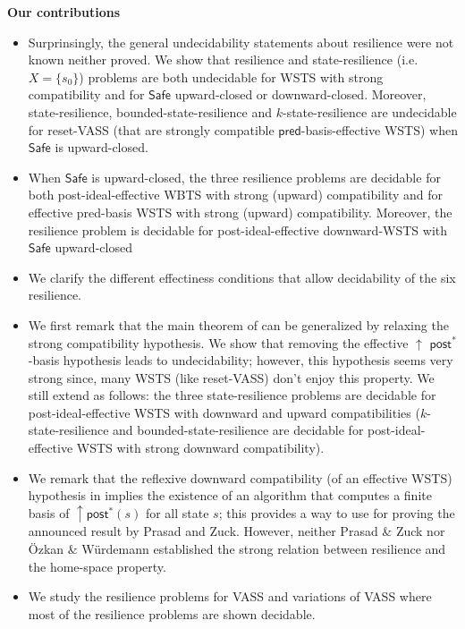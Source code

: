 \documentclass[runningheads]{llncs}
\newcommand{\pred}{\textsf{pred}}
\newcommand{\post}{\textsf{post}}
\newcommand{\Safe}{\textsf{Safe}}
\begin{document}
\noindent
{\bf Our contributions}
\begin{itemize}
\item Surprinsingly, the general undecidability statements about resilience were not known neither proved. We show that resilience and {state-resilience} (i.e. $X=\{s_0\}$) problems are both undecidable for WSTS with strong compatibility and for $\Safe$ upward-closed or downward-closed. 
Moreover, {state-resilience},
{bounded-state-resilience} and
{$k$-state-resilience}
are undecidable for reset-VASS (that are strongly compatible $\pred$-basis-effective WSTS) when
$\Safe$ is upward-closed. 
\item When $\Safe$ is upward-closed, the three resilience problems are decidable for both post-ideal-effective WBTS with strong (upward) compatibility and for effective pred-basis WSTS with strong (upward) compatibility. Moreover, the resilience problem is decidable for post-ideal-effective downward-WSTS with 
$\Safe$ upward-closed
%
%
\item We clarify the different effectiness conditions that allow decidability of the six resilience.
%
\item We first remark that the main theorem of \cite{DBLP:journals/corr/abs-2108-00889,DBLP:conf/gg/Ozkan22} can be generalized by relaxing the  strong compatibility hypothesis. We show that removing the effective 
$\mathop{\uparrow}$ $\post^*$-basis hypothesis leads to undecidability; however, this hypothesis seems very strong since, many WSTS (like reset-VASS) don't enjoy this property. We still extend  \cite{DBLP:journals/corr/PrasadZ16} as follows: the three state-resilience problems are decidable for post-ideal-effective WSTS with downward and upward compatibilities ({$k$-state-resilience} and {bounded-state-resilience} are decidable for post-ideal-effective WSTS with strong downward compatibility).
%
\item We remark that the reflexive downward compatibility (of an effective WSTS) hypothesis in  \cite{DBLP:journals/corr/PrasadZ16} implies the existence of an algorithm that computes a finite basis of $\mathop{\uparrow} \post^*(s)$ for all state $s$; this provides a way to use \cite{DBLP:journals/corr/abs-2108-00889} for proving the announced result by Prasad and Zuck.
However, neither Prasad \& Zuck nor \"Ozkan \& Würdemann established the strong relation between resilience and the home-space property.
%
\item We study the resilience problems for VASS and variations of VASS where most of the resilience problems are shown decidable.
\end{itemize}
\end{document}
